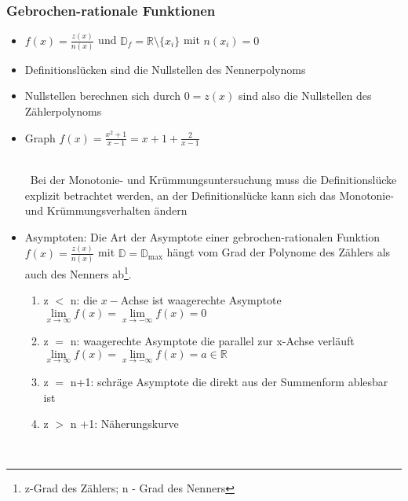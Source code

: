 \documentclass[a4paper,twocolumn,10pt]{onepgnote}
\renewcommand\mynote{\notebox{Hinweis:}\ }  %
\begin{document}
\subsubsection{Gebrochen-rationale Funktionen}
\begin{itemize}
\item $f(x) = \frac{z(x)}{n(x)}$ und $\mathds{D}_f = \mathds{R}\setminus\{x_i\}$ mit $n(x_i) = 0$
\item Definitionslücken sind die Nullstellen des Nennerpolynoms
\item Nullstellen berechnen sich durch  $0= z(x)$ sind also die Nullstellen des Zählerpolynoms
\item Graph $f(x) = \frac{x^2+1}{x-1} = x+1 +\frac{2}{x-1} $\\
 \\
\mynote Bei der Monotonie- und Krümmungsuntersuchung muss die Definitionslücke explizit betrachtet werden, an der Definitionslücke kann sich das Monotonie- und Krümmungsverhalten ändern
\item Asymptoten: Die Art der Asymptote einer gebrochen-rationalen Funktion $f(x)=\frac{z(x)}{n(x)}$ mit $\mathds{D} = \mathds{D}_{\text{max}}$ hängt vom Grad der Polynome des Zählers  als auch des Nenners ab\footnote{z-Grad des Zählers; n - Grad des Nenners}.\\
\begin{enumerate}\item z $<$ n: die $x-$Achse ist waagerechte Asymptote $\lim\limits_{x\longrightarrow \infty} f(x) = \lim\limits_{x\longrightarrow -\infty} f(x) = 0$\\
\item  z $=$ n: waagerechte Asymptote die parallel zur x-Achse verläuft $\lim\limits_{x\longrightarrow \infty} f(x) = \lim\limits_{x\longrightarrow -\infty} f(x) = a \in\mathds{R}$\\
\item z $=$ n+1: schräge Asymptote die direkt aus der Summenform ablesbar ist\\
\item z $>$ n +1: Näherungskurve
\end{enumerate}\\

 \end{itemize}
\end{document}
